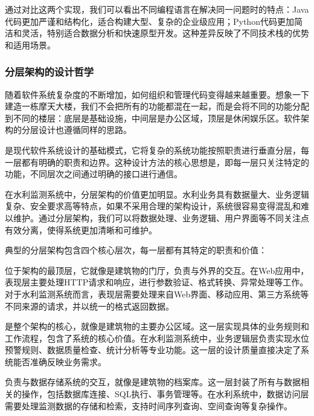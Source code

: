 通过对比这两个实现，我们可以看出不同编程语言在解决同一问题时的特点：Java代码更加严谨和结构化，适合构建大型、复杂的企业级应用；Python代码更加简洁和灵活，特别适合数据分析和快速原型开发。这种差异反映了不同技术栈的优势和适用场景。

\hypertarget{ux5206ux5c42ux67b6ux6784ux7684ux8bbeux8ba1ux54f2ux5b66}{%
\subsubsection{分层架构的设计哲学}\label{ux5206ux5c42ux67b6ux6784ux7684ux8bbeux8ba1ux54f2ux5b66}}

随着软件系统复杂度的不断增加，如何组织和管理代码变得越来越重要。想象一下建造一栋摩天大楼，我们不会把所有的功能都混在一起，而是会将不同的功能分配到不同的楼层：底层是基础设施，中间层是办公区域，顶层是休闲娱乐区。软件架构的分层设计也遵循同样的思路。

是现代软件系统设计的基础模式，它将复杂的系统功能按照职责进行垂直分层，每一层都有明确的职责和边界。这种设计方法的核心思想是，即每一层只关注特定的功能，不同层次之间通过明确的接口进行通信。

在水利监测系统中，分层架构的价值更加明显。水利业务具有数据量大、业务逻辑复杂、安全要求高等特点，如果不采用合理的架构设计，系统很容易变得混乱和难以维护。通过分层架构，我们可以将数据处理、业务逻辑、用户界面等不同关注点有效分离，使得系统更加清晰和可维护。

典型的分层架构包含四个核心层次，每一层都有其特定的职责和价值：

位于架构的最顶层，它就像是建筑物的门厅，负责与外界的交互。在Web应用中，表现层主要处理HTTP请求和响应，进行参数验证、格式转换、异常处理等工作。对于水利监测系统而言，表现层需要处理来自Web界面、移动应用、第三方系统等不同来源的请求，并以统一的格式返回数据。

是整个架构的核心，就像是建筑物的主要办公区域。这一层实现具体的业务规则和工作流程，包含了系统的核心价值。在水利监测系统中，业务逻辑层负责实现水位预警规则、数据质量检查、统计分析等专业功能。这一层的设计质量直接决定了系统能否准确反映业务需求。

负责与数据存储系统的交互，就像是建筑物的档案库。这一层封装了所有与数据相关的操作，包括数据库连接、SQL执行、事务管理等。在水利系统中，数据访问层需要处理监测数据的存储和检索，支持时间序列查询、空间查询等复杂操作。

